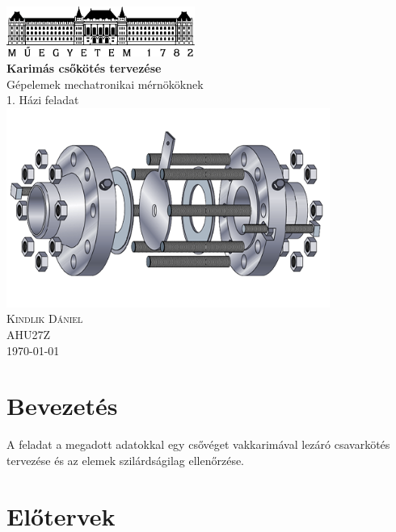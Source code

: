 \documentclass[10pt, a4paper]{article}
\begin{document}
	\begin{titlepage}
		\centering
		\includegraphics[width=175pt]{ BMElogo.png } \\
		\vspace*{2cm}
		{\Huge \bfseries Karimás csőkötés tervezése} \\
		\vspace{0.5cm}
		{\Large Gépelemek mechatronikai mérnököknek} \\
		\vspace{0.5cm}
		{\Large 1. Házi feladat} \\
		\includegraphics[width=300pt, angle=-90]{ karima_rajz.png } \\
		\vspace{1cm}
		{\Large \scshape Kindlik Dániel} \\
		\vspace{0.5cm}
		AHU27Z \\
		\vfill
		{\large \today} \\
	\end{titlepage}
	
	\thispagestyle{empty}
	\tableofcontents
	\newpage
	\setcounter{page}{3}
	\section*{Bevezetés}
	A feladat a megadott adatokkal egy csővéget vakkarimával lezáró csavarkötés tervezése és az elemek szilárdságilag
	ellenőrzése.
	\section{Előtervek}
\end{document}
